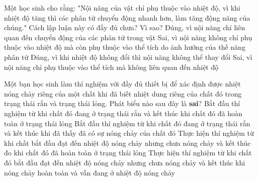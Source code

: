 \begin{ex}%
	Một học sinh cho rằng: "Nội năng của vật chỉ phụ thuộc vào nhiệt độ, vì khi nhiệt độ tăng thì các phân tử chuyển động nhanh hơn, làm tăng động năng của chúng." Cách lập luận này có đầy đủ chưa? Vì sao?
	\choice
	{Đúng, vì nội năng chỉ liên quan đến chuyển động của các phân tử trong vật}
	{\True Sai, vì nội năng không chỉ phụ thuộc vào nhiệt độ mà còn phụ thuộc vào thể tích do ảnh hưởng của thế năng phân tử}
	{Đúng, vì khi nhiệt độ không đổi thì nội năng không thể thay đổi}
	{Sai, vì nội năng chỉ phụ thuộc vào thể tích mà không liên quan đến nhiệt độ}
\end{ex}

\begin{ex}%
 Một bạn học sinh làm thí nghiệm với đầy đủ thiết bị để xác định được nhiệt nóng chảy riêng của một chất khi đã biết nhiệt dung riêng của chất đó trong trạng thái rắn và trạng thái lỏng. Phát biểu nào sau đây là \textbf{sai}?
	\choice
	{Bắt đầu thí nghiệm từ khi chất đó đang ở trạng thái rắn và kết thúc khi chất đó đã hoàn toàn ở trạng thái lỏng}
	{\True Bắt đầu thí nghiệm từ khi chất đó đang ở trạng thái rắn và kết thúc khi đã thấy đã có sự nóng chảy của chất đó}
	{Thực hiện thí nghiệm từ khi chất bắt đầu đạt đến nhiệt độ nóng chảy nhưng chưa nóng chảy và kết thúc đo khi chất đó đã hoàn toàn ở trạng thái lỏng}
	{Thực hiện thí nghiệm từ khi chất đó bắt đầu đạt đến nhiệt độ nóng chảy nhưng chưa nóng chảy và kết thúc khi nóng chảy hoàn toàn và vẫn đang ở nhiệt độ nóng chảy}
\end{ex}

